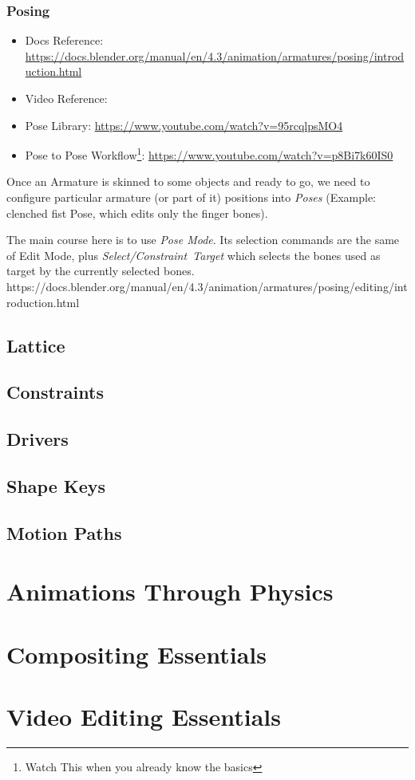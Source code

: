 \documentclass{article}
\begin{document}
\subsubsection{Posing}
\begin{itemize}[topsep=0pt, noitemsep]
    \item Docs Reference: \href{https://docs.blender.org/manual/en/4.3/animation/armatures/posing/introduction.html}{https://docs.blender.org/manual/en/4.3/animation/armatures/posing/introduction.html}
    \item Video Reference: 
    \item Pose Library: \href{https://www.youtube.com/watch?v=95rcqlpsMO4}{https://www.youtube.com/watch?v=95rcqlpsMO4}
    \item Pose to Pose Workflow\footnote{Watch This when you already know the basics}: \href{https://www.youtube.com/watch?v=p8Bi7k60IS0}{https://www.youtube.com/watch?v=p8Bi7k60IS0}
\end{itemize}
Once an Armature is skinned to some objects and ready to go, we need to configure particular armature (or part of it) positions into \textit{Poses} (Example: 
clenched fist Pose, which edits only the finger bones).\par
The main course here is to use \textit{Pose Mode}. Its selection commands are the same of Edit Mode, plus \mbox{\textit{Select/Constraint Target}} which selects the bones used as target by the currently
selected bones.\\

https://docs.blender.org/manual/en/4.3/animation/armatures/posing/editing/introduction.html

\subsection{Lattice}
\subsection{Constraints}
\subsection{Drivers}
\subsection{Shape Keys}
\subsection{Motion Paths}

\section{Animations Through Physics}

\section{Compositing Essentials}

\section{Video Editing Essentials}
\end{document}
